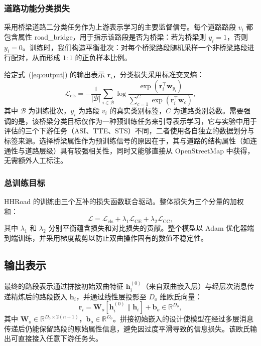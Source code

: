 \subsubsection{道路功能分类损失}

采用桥梁道路二分类任务作为上游表示学习的主要监督信号。每个道路路段 $v_i$ 都包含属性 road\_bridge，用于指示该路段是否为桥梁：若为桥梁则 $y_i{=}1$，否则 $y_i{=}0$。训练时，我们构造平衡批次：对每个桥梁路段随机采样一个非桥梁路段进行配对，从而形成 $1\!:\!1$ 的正负样本比例。

给定式~(\ref{eq:output}) 的输出表示 $\mathbf{r}_i$，分类损失采用标准交叉熵：
\begin{equation}
    \mathcal{L}_{\text{cls}} = -\frac{1}{|\mathcal{B}|} \sum_{i \in \mathcal{B}}
    \log \frac{\exp(\mathbf{r}_i^\top \mathbf{w}_{y_i})}
         {\sum_{c=1}^{C} \exp(\mathbf{r}_i^\top \mathbf{w}_{c})},
    \label{eq:loss_cls}
\end{equation}
其中 $\mathcal{B}$ 为训练批次，$y_i$ 为路段 $v_i$ 的真实类别标签，$C$ 为道路类别总数。需要强调的是，该桥梁分类目标仅作为一种预训练任务来引导表示学习，它与实验中用于评估的三个下游任务（ASI、TTE、STS）不同，二者使用各自独立的数据划分与标签来源。选择桥梁属性作为预训练信号的原因在于，其与道路的结构属性（如连通性与道路层级）具有较强相关性，同时又能够直接从 OpenStreetMap 中获得，无需额外人工标注。

\subsubsection{总训练目标}

HHRoad 的训练由三个互补的损失函数联合驱动。整体损失为三个分量的加权和：
\begin{equation}
    \mathcal{L} = \mathcal{L}_{\text{cls}}
    + \lambda_1 \mathcal{L}_{\text{CE}}
    + \lambda_2 \mathcal{L}_{\text{CC}},
    \label{eq:total_loss}
\end{equation}
其中 $\lambda_1$ 和 $\lambda_2$ 分别平衡蕴含损失和对比损失的贡献。整个模型以 Adam 优化器端到端训练，并采用梯度裁剪以防止双曲操作固有的数值不稳定性。

\subsection{输出表示}

最终的路段表示通过拼接初始双曲特征 $\mathbf{h}_i^{(0)}$（来自双曲嵌入层）与经层次消息传递精炼后的路段嵌入 $\mathbf{h}_i$，并通过线性层投影至 $D_o$ 维欧氏向量：
\begin{equation}
    \mathbf{r}_i = \mathbf{W}_o [\mathbf{h}_i^{(0)} \| \mathbf{h}_i] + \mathbf{b}_o
    \in \mathbb{R}^{D_o},
    \label{eq:output}
\end{equation}
其中 $\mathbf{W}_o \in \mathbb{R}^{D_o \times 2(n+1)}$，$\mathbf{b}_o \in \mathbb{R}^{D_o}$。拼接初始嵌入的设计使模型在经过多层消息传递后仍能保留路段的原始属性信息，避免因过度平滑导致的信息损失。该欧氏输出可直接接入任意下游任务头。


